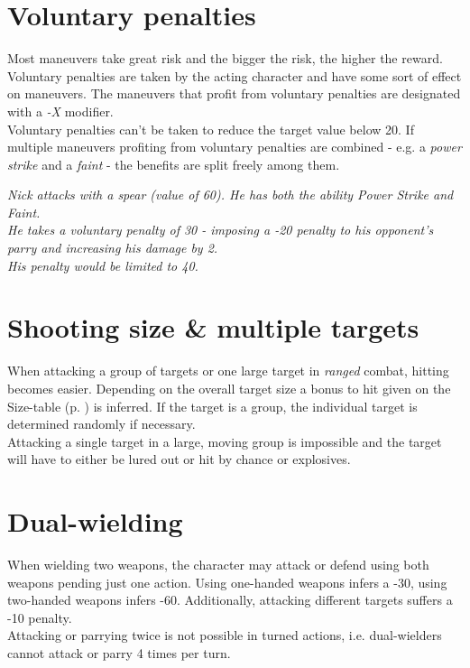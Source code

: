 \section{Voluntary penalties}
Most maneuvers take great risk and the bigger the risk, the higher the reward. Voluntary penalties are taken by the acting character and have some sort of effect on maneuvers. The maneuvers that profit from voluntary penalties are designated with a \emph{-X} modifier.\\
Voluntary penalties can’t be taken to reduce the target value below 20. If multiple maneuvers profiting from voluntary penalties are combined - e.g. a \emph{power strike} and a \emph{faint} - the benefits are split freely among them.
\begin{exampleblock}
	\itshape
	Nick attacks with a spear (value of 60). He has both the ability Power Strike and Faint.\\
	He takes a voluntary penalty of 30 - imposing a -20 penalty to his opponent's parry and increasing his damage by 2.\\
	His penalty would be limited to 40.
\end{exampleblock}

\section{Shooting size \& multiple targets}
When attacking a group of targets or one large target in \emph{ranged} combat,
	hitting becomes easier.
Depending on the overall target size a bonus to hit given on the Size-table (p. \pageref{sizestable}) is inferred.
If the target is a group, the individual target is determined randomly if necessary.\\
Attacking a single target in a large, moving group is impossible and the target will have to either be lured out or hit by chance or explosives.
\section{Dual-wielding}
When wielding two weapons,
	the character may attack or defend using both weapons pending just one action.
Using one-handed weapons infers a -30,
	using two-handed weapons infers -60.
Additionally, attacking different targets suffers a -10 penalty.\\
Attacking or parrying twice is not possible in turned actions,
	i.e. dual-wielders cannot attack or parry 4 times per turn.
